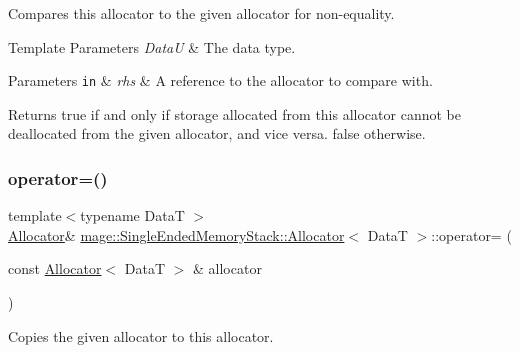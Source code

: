 Compares this allocator to the given allocator for non-\/equality.


\begin{DoxyTemplParams}{Template Parameters}
{\em DataU} & The data type. \\
\hline
\end{DoxyTemplParams}

\begin{DoxyParams}[1]{Parameters}
\mbox{\tt in}  & {\em rhs} & A reference to the allocator to compare with. \\
\hline
\end{DoxyParams}
\begin{DoxyReturn}{Returns}
{\ttfamily true} if and only if storage allocated from this allocator cannot be deallocated from the given allocator, and vice versa. {\ttfamily false} otherwise. 
\end{DoxyReturn}
\hypertarget{structmage_1_1_single_ended_memory_stack_1_1_allocator_a22dbfaa5a0125fea5fdca730f07dac2c}{}\label{structmage_1_1_single_ended_memory_stack_1_1_allocator_a22dbfaa5a0125fea5fdca730f07dac2c} 
\subsubsection{\texorpdfstring{operator=()}{operator=()}\hspace{0.1cm}{\footnotesize\ttfamily [1/2]}}
{\footnotesize\ttfamily template$<$typename DataT $>$ \\
\hyperlink{structmage_1_1_single_ended_memory_stack_1_1_allocator}{Allocator}\& \hyperlink{structmage_1_1_single_ended_memory_stack_1_1_allocator}{mage\+::\+Single\+Ended\+Memory\+Stack\+::\+Allocator}$<$ DataT $>$\+::operator= (\begin{DoxyParamCaption}\item[{const \hyperlink{structmage_1_1_single_ended_memory_stack_1_1_allocator}{Allocator}$<$ DataT $>$ \&}]{allocator }\end{DoxyParamCaption})\hspace{0.3cm}{\ttfamily [delete]}}

Copies the given allocator to this allocator.


